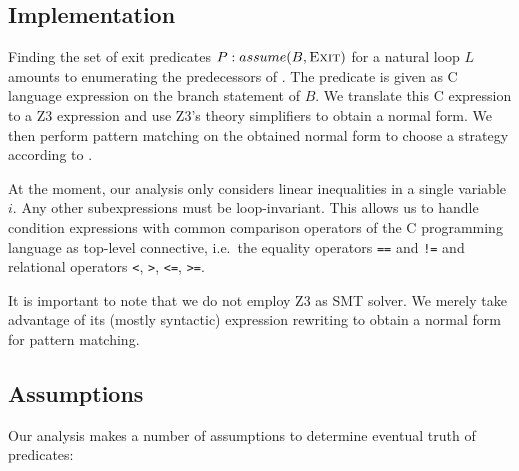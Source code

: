 \subsection{Implementation}
Finding the set of exit predicates $P: assume(B, \textsc{Exit})$ for a natural loop $L$ amounts to enumerating the predecessors of \exit{}. The predicate is given as C language expression on the branch statement of $B$. We translate this C expression to a Z3 expression \cite{DBLP:conf/tacas/MouraB08} and use Z3's theory simplifiers to obtain a normal form. We then perform pattern matching on the obtained normal form to choose a strategy according to .

At the moment, our analysis only considers linear inequalities in a single variable $i$. Any other subexpressions must be loop-invariant. This allows us to handle condition expressions with common comparison operators of the C programming language as top-level connective, i.e.\ the equality operators \texttt{==} and \texttt{!=} and relational operators \texttt{<}, \texttt{>}, \texttt{<=}, \texttt{>=}.

It is important to note that we do not employ Z3 as SMT solver. We merely take advantage of its (mostly syntactic) expression rewriting to obtain a normal form for pattern matching.

\subsection{Assumptions}
\label{sec:assumptions}

Our analysis makes a number of assumptions to determine eventual truth of predicates:

